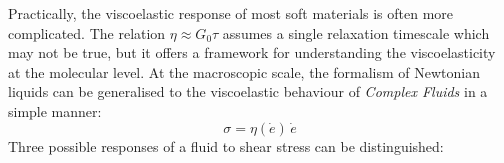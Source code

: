 \documentclass[a4paper, 11pt, normalem]{report}
\begin{document}
\begin{figure}[H]
    \centering
\end{figure}
Practically, the viscoelastic response of most soft materials is often more complicated.
The relation $\eta \approx G_0\tau$ assumes a single relaxation timescale which may not be true, but it offers a framework for understanding the viscoelasticity at the molecular level.
At the macroscopic scale, the formalism of Newtonian liquids can be generalised to the viscoelastic behaviour of \emph{Complex Fluids} in a simple manner:
\begin{equation}
    \sigma = \eta(\dot{e})\,\dot{e}
\end{equation}
Three possible responses of a fluid to shear stress can be distinguished:
\end{document}
